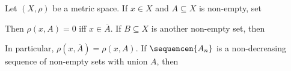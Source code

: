    Let $(X,\rho)$ be a metric
space.   If $x\in X$ and $A\subseteq X$ is non-empty, set


\noindent Then $\rho(x,A)=0$ iff $x\in\overline{A}$.
If $B\subseteq X$ is another non-empty set, then


\noindent In particular, $\rho(x,\overline{A})=\rho(x,A)$.   If
$\sequencen{A_n}$ is a non-decreasing sequence of non-empty sets with
union $A$, then


\discrpage

